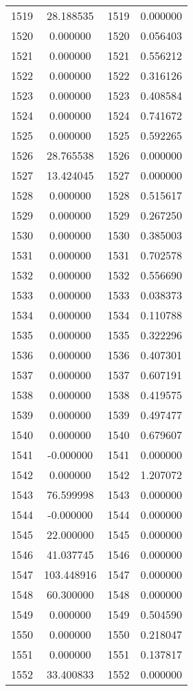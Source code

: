 \documentclass[12pt]{article}
\begin{document}
\begin{longtable}{@{}cccc@{}}
1519 & 28.188535 & 1519 & 0.000000 \\
1520 & 0.000000 & 1520 & 0.056403 \\
1521 & 0.000000 & 1521 & 0.556212 \\
1522 & 0.000000 & 1522 & 0.316126 \\
1523 & 0.000000 & 1523 & 0.408584 \\
1524 & 0.000000 & 1524 & 0.741672 \\
1525 & 0.000000 & 1525 & 0.592265 \\
1526 & 28.765538 & 1526 & 0.000000 \\
1527 & 13.424045 & 1527 & 0.000000 \\
1528 & 0.000000 & 1528 & 0.515617 \\
1529 & 0.000000 & 1529 & 0.267250 \\
1530 & 0.000000 & 1530 & 0.385003 \\
1531 & 0.000000 & 1531 & 0.702578 \\
1532 & 0.000000 & 1532 & 0.556690 \\
1533 & 0.000000 & 1533 & 0.038373 \\
1534 & 0.000000 & 1534 & 0.110788 \\
1535 & 0.000000 & 1535 & 0.322296 \\
1536 & 0.000000 & 1536 & 0.407301 \\
1537 & 0.000000 & 1537 & 0.607191 \\
1538 & 0.000000 & 1538 & 0.419575 \\
1539 & 0.000000 & 1539 & 0.497477 \\
1540 & 0.000000 & 1540 & 0.679607 \\
1541 & -0.000000 & 1541 & 0.000000 \\
1542 & 0.000000 & 1542 & 1.207072 \\
1543 & 76.599998 & 1543 & 0.000000 \\
1544 & -0.000000 & 1544 & 0.000000 \\
1545 & 22.000000 & 1545 & 0.000000 \\
1546 & 41.037745 & 1546 & 0.000000 \\
1547 & 103.448916 & 1547 & 0.000000 \\
1548 & 60.300000 & 1548 & 0.000000 \\
1549 & 0.000000 & 1549 & 0.504590 \\
1550 & 0.000000 & 1550 & 0.218047 \\
1551 & 0.000000 & 1551 & 0.137817 \\
1552 & 33.400833 & 1552 & 0.000000 \\

\end{longtable}
\end{document}
